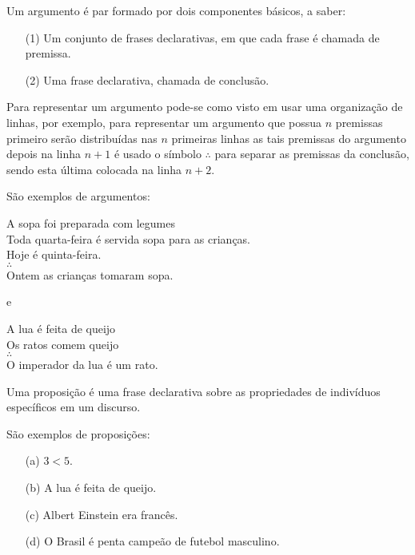 \begin{definition}[Argumento]\label{def:Argumento}
	Um argumento é par formado por dois componentes básicos, a saber:
	\begin{itemize}
		\item[(1)] Um conjunto de frases declarativas, em que cada frase é chamada de premissa.
		\item[(2)] Uma frase declarativa, chamada de conclusão.
	\end{itemize}
\end{definition}

Para representar um argumento pode-se como visto em \cite{copi1981, joaoPavao2014} usar uma organização de linhas, por exemplo, para representar um argumento que possua $n$ premissas primeiro serão distribuídas nas $n$ primeiras linhas as tais premissas do argumento depois na linha $n+1$ é usado o símbolo $\therefore$ para separar as premissas da conclusão, sendo esta última colocada na linha $n+2$.

\begin{example}\label{exe:Argumento}
    São exemplos de argumentos:
    
		\begin{center}
			A sopa foi preparada  com legumes\\ 
			Toda quarta-feira é servida sopa para as crianças.\\
			Hoje é quinta-feira.\\
			$\therefore$\\
			Ontem as crianças tomaram sopa.
		\end{center}
	
		e
		
		\begin{center}
			A lua é feita de queijo\\
			Os ratos comem queijo\\ 
			$\therefore$\\
			O imperador da lua é um rato.
		\end{center}
\end{example}

\begin{definition}[Proposição]\label{def:Proposicao}
	Uma proposição é uma frase declarativa sobre as propriedades de indivíduos específicos em um discurso.
\end{definition}

\begin{example}\label{exe:Proposicoes}
    São exemplos de proposições:
	\begin{itemize}
		\item[(a)] $3 < 5$.
		\item[(b)] A lua é feita de queijo.
		\item[(c)] Albert Einstein era francês.
		\item[(d)] O Brasil é penta campeão de futebol masculino.
	\end{itemize}
\end{example}

